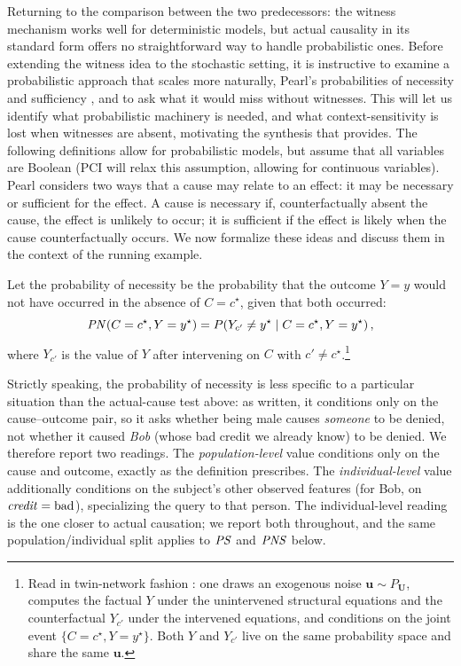 \noindent Returning to the comparison between the two predecessors: the witness mechanism
works well for deterministic models, but actual causality
in its standard form offers no straightforward way to handle probabilistic ones. Before
extending the witness idea to the stochastic setting, it is instructive to examine a
probabilistic approach that scales more naturally, Pearl's probabilities of necessity
and sufficiency \citep{pearl2022probabilities}, and to ask what it would miss without
witnesses. This will let us identify what probabilistic machinery is needed, and what
context-sensitivity is lost when witnesses are absent, motivating the synthesis that
\ourapproach provides.
The following definitions allow for probabilistic models, but assume that all variables are Boolean (PCI will relax this assumption,
 allowing for continuous variables).
Pearl considers two ways that a cause may relate to an effect: it may be necessary or sufficient for the effect.
A cause is necessary if, counterfactually absent the cause, the effect is unlikely to occur; it is sufficient
if the effect is likely when the cause counterfactually occurs.
We now formalize these ideas and discuss them in the context of the running example.

\begin{definition}
Let the probability of necessity \citep{pearl1999probabilities} be the probability that the outcome $Y=y$ would not have occurred in the absence of  $C = c^\star$, given that both occurred: \[\mathit{PN}(C = c^\star, Y = y^\star) = P\!\left(Y_{c'} \neq y^\star \;\middle|\; C = c^\star, Y = y^\star\right),\] where $Y_{c'}$ is the value of $Y$ after intervening on $C$ with $c'\neq c^\star$.\footnote{\label{fn:twin-network}Read in twin-network fashion \citep{balke1994probabilistic, causalityPearl}: one draws an exogenous noise $\mathbf{u}\sim P_{\mathbf{U}}$, computes the factual $Y$ under the unintervened structural equations and the counterfactual $Y_{c'}$ under the intervened equations, and conditions on the joint event $\{C=c^\star,Y=y^\star\}$. Both $Y$ and $Y_{c'}$ live on the same probability space and share the same $\mathbf{u}$.}
\end{definition}

Strictly speaking, the probability of necessity is less specific to a particular situation than the actual-cause test above: as written, it conditions only on the cause--outcome pair, so it asks whether being male causes \emph{someone} to be denied, not whether it caused \emph{Bob} (whose bad credit we already know) to be denied.
We therefore report two readings.
The \emph{population-level} value conditions only on the cause and outcome, exactly as the definition prescribes.
The \emph{individual-level} value additionally conditions on the subject's other observed features (for Bob, on $\varname{credit}=\text{bad}$), specializing the query to that person.
The individual-level reading is the one closer to actual causation; we report both throughout, and the same population/individual split applies to $\mathit{PS}$ and $\mathit{PNS}$ below.


